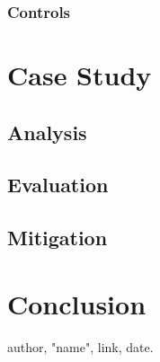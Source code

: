 \documentclass[11pt,a4paper,draft]{article}
\begin{document}
\subsubsection{Controls}

\section{Case Study}

\subsection{Analysis}

\subsection{Evaluation}

\subsection{Mitigation}

\section{Conclusion}

\cite{item}

\begin{thebibliography}{9}

author,
"name",
link,
date.

\end{thebibliography}
\end{document}
